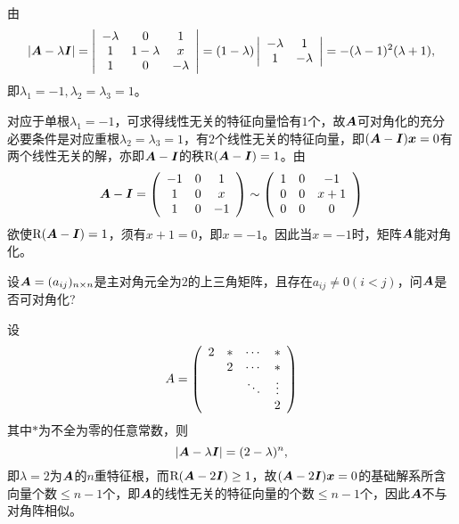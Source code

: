 \begin{frame}[fragile]\ft{\secname}

\begin{jie}
  由
  $$
  |\boldsymbol{A}-\lambda\boldsymbol{I}|=
  \left|
    \begin{array}{ccc}
      -\lambda&0&1\\
      1&1-\lambda&x\\
      1&0&-\lambda
    \end{array}
  \right|
  =(1-\lambda)
  \left|
    \begin{array}{ccc}
      -\lambda&1\\
      1&-\lambda
    \end{array}
  \right|=-(\lambda-1)^2(\lambda+1),
  $$
  即$\lambda_1=-1,\lambda_2=\lambda_3=1$。

  对应于单根$\lambda_1=-1$，可求得线性无关的特征向量恰有$1$个，故$\boldsymbol{A}$可对角化的充分必要条件是对应重根$\lambda_2=\lambda_3=1$，有$2$个线性无关的特征向量，即$(\boldsymbol{A}-\boldsymbol{I}){\boldsymbol{x}}=0$有两个线性无关的解，亦即$\boldsymbol{A}-\boldsymbol{I}$的秩$\mathrm{R}(\boldsymbol{A}-\boldsymbol{I})=1$。由
  $$
  \boldsymbol{A}-\boldsymbol{I}=\left(
    \begin{array}{ccc}
      -1&0&1\\
      1&0&x\\
      1&0&-1
    \end{array}
  \right)\sim \left(
    \begin{array}{ccc}
      1&0&-1\\
      0&0&x+1\\
      0&0&0
    \end{array}
  \right)
  $$
  欲使$\mathrm{R}(\boldsymbol{A}-\boldsymbol{I})=1$，须有$x+1=0$，即$x=-1$。因此当$x=-1$时，矩阵$\boldsymbol{A}$能对角化。
\end{jie}

\end{frame}

\begin{frame}[fragile]\ft{\secname}

\begin{li}
  设$\boldsymbol{A}=(a_{ij})_{n\times n}$是主对角元全为$2$的上三角矩阵，且存在$a_{ij}\ne 0(i<j)$，问$\boldsymbol{A}$是否可对角化?
\end{li}

\end{frame}

\begin{frame}[fragile]\ft{\secname}
\begin{jie}
  设
  $$
  A=\left(
    \begin{array}{cccc}
      2&*&\cdots&*\\
       &2&\cdots&*\\
       &&\ddots&\vdots\\
       &&&2
    \end{array}
  \right)
  $$
  其中$*$为不全为零的任意常数，则
  $$
  |\boldsymbol{A}-\lambda\boldsymbol{I}|=(2-\lambda)^n,
  $$
  即$\lambda=2$为$\boldsymbol{A}$的$n$重特征根，而$\mathrm{R}(\boldsymbol{A}-2\boldsymbol{I})\ge 1$，故$(\boldsymbol{A}-2\boldsymbol{I}){\boldsymbol{x}}=0$的基础解系所含向量个数$\le n-1$个，即$\boldsymbol{A}$的线性无关的特征向量的个数$\le n-1$个，因此$\boldsymbol{A}$不与对角阵相似。
\end{jie}
\end{frame}
